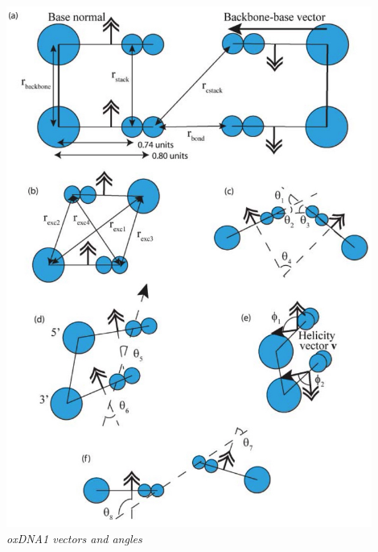 \documentclass[slidestop,compress,9pt]{beamer}
\begin{document}
\begin{frame}
\begin{columns}
\begin{column}{0.44\textwidth}
\vspace*{-0.25cm}
\begin{center}
\includegraphics[width=0.9\textwidth]{oxdna.jpg}
\textit{oxDNA1 vectors and angles}
\end{center}
\end{column}
\end{columns}

\end{frame}
\end{document}

